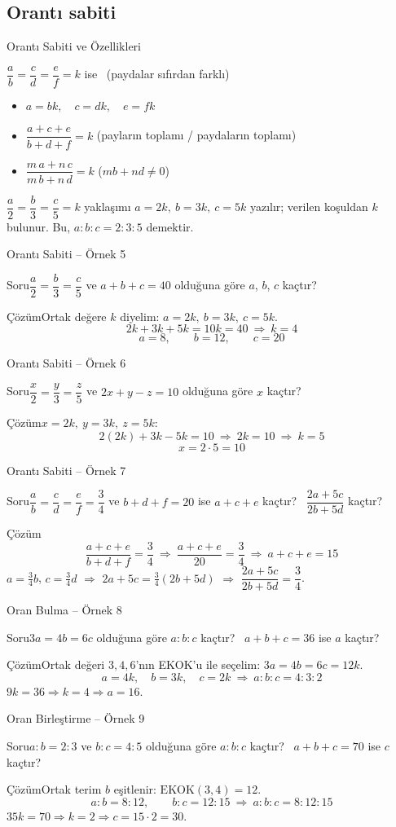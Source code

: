 \documentclass[aspectratio=169,11pt]{beamer}
\newcommand{\soru}[3]{%
\begin{frame}{#1}
  \begin{block}{Soru}\large #2\end{block}
  \pause
  \begin{exampleblock}{Çözüm}\large #3\end{exampleblock}
\end{frame}}
\begin{document}
\subsection{Orantı sabiti}
\begin{frame}{Orantı Sabiti ve Özellikleri}
\begin{block}{\(\dfrac{a}{b}=\dfrac{c}{d}=\dfrac{e}{f}=k\) ise \ (paydalar sıfırdan farklı)}
\begin{itemize}
\item \(a=bk,\quad c=dk,\quad e=fk\)
\item \(\dfrac{a+c+e}{b+d+f}=k\) \qquad (payların toplamı / paydaların toplamı)
\item \(\dfrac{m\,a+n\,c}{m\,b+n\,d}=k\) \qquad (\(mb+nd\neq 0\))
\end{itemize}
\end{block}
\begin{block}{\(\dfrac{a}{2}=\dfrac{b}{3}=\dfrac{c}{5}=k\) yaklaşımı}
\(a=2k,\ b=3k,\ c=5k\) yazılır; verilen koşuldan \(k\) bulunur. Bu, \(a:b:c=2:3:5\) demektir.
\end{block}
\end{frame}

\soru{Orantı Sabiti -- Örnek 5}
{\(\dfrac{a}{2}=\dfrac{b}{3}=\dfrac{c}{5}\) ve \(a+b+c=40\) olduğuna göre \(a\), \(b\), \(c\) kaçtır?}
{Ortak değere \(k\) diyelim: \(a=2k,\ b=3k,\ c=5k\).
\[2k+3k+5k=10k=40\ \Rightarrow\ k=4\]
\[a=8,\qquad b=12,\qquad c=20\]}

\soru{Orantı Sabiti -- Örnek 6}
{\(\dfrac{x}{2}=\dfrac{y}{3}=\dfrac{z}{5}\) ve \(2x+y-z=10\) olduğuna göre \(x\) kaçtır?}
{\(x=2k,\ y=3k,\ z=5k\):
\[2(2k)+3k-5k=10\ \Rightarrow\ 2k=10\ \Rightarrow\ k=5\]
\[x=2\cdot 5=10\]}

\soru{Orantı Sabiti -- Örnek 7}
{\(\dfrac{a}{b}=\dfrac{c}{d}=\dfrac{e}{f}=\dfrac{3}{4}\) ve \(b+d+f=20\) ise \(a+c+e\) kaçtır? \ \(\dfrac{2a+5c}{2b+5d}\) kaçtır?}
{\[\frac{a+c+e}{b+d+f}=\frac{3}{4}\ \Rightarrow\ \frac{a+c+e}{20}=\frac{3}{4}\ \Rightarrow\ a+c+e=15\]
\(a=\tfrac34 b\), \(c=\tfrac34 d\) \(\Rightarrow\) \(2a+5c=\tfrac34(2b+5d)\) \(\Rightarrow\) \(\dfrac{2a+5c}{2b+5d}=\dfrac{3}{4}\).}

\soru{Oran Bulma -- Örnek 8}
{\(3a=4b=6c\) olduğuna göre \(a:b:c\) kaçtır? \ \(a+b+c=36\) ise \(a\) kaçtır?}
{Ortak değeri \(3,4,6\)'nın EKOK'u ile seçelim: \(3a=4b=6c=12k\).
\[a=4k,\quad b=3k,\quad c=2k\ \Rightarrow\ a:b:c=4:3:2\]
\(9k=36\Rightarrow k=4\Rightarrow a=16\).}

\soru{Oran Birleştirme -- Örnek 9}
{\(a:b=2:3\) ve \(b:c=4:5\) olduğuna göre \(a:b:c\) kaçtır? \ \(a+b+c=70\) ise \(c\) kaçtır?}
{Ortak terim \(b\) eşitlenir: \(\mathrm{EKOK}(3,4)=12\).
\[a:b=8:12,\qquad b:c=12:15\ \Rightarrow\ a:b:c=8:12:15\]
\(35k=70\Rightarrow k=2\Rightarrow c=15\cdot 2=30\).}
\end{document}
